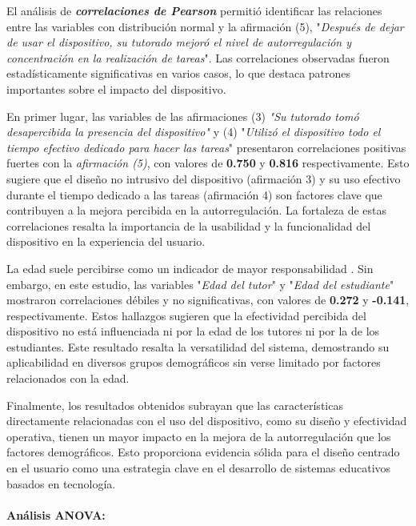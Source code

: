 \documentclass[a4paper,fleqn]{cas-sc}
\begin{document}
					El análisis de \textit{\textbf{correlaciones de Pearson}} permitió identificar las relaciones entre las variables con distribución normal y la afirmación (5), "\textit{Después de dejar de usar el dispositivo, su tutorado mejoró el nivel de autorregulación y concentración en la realización de tareas}". Las correlaciones observadas fueron estadísticamente significativas en varios casos, lo que destaca patrones importantes sobre el impacto del dispositivo.
					
					En primer lugar, las variables de las afirmaciones (3) \textit{"Su tutorado tomó desapercibida la presencia del dispositivo"} y (4) "\textit{Utilizó el dispositivo todo el tiempo efectivo dedicado para hacer las tareas}" presentaron correlaciones positivas fuertes con la \textit{afirmación (5)}, con valores de \textbf{0.750} y \textbf{0.816} respectivamente. Esto sugiere que el diseño no intrusivo del dispositivo (afirmación 3) y su uso efectivo durante el tiempo dedicado a las tareas (afirmación 4) son factores clave que contribuyen a la mejora percibida en la autorregulación. La fortaleza de estas correlaciones resalta la importancia de la usabilidad y la funcionalidad del dispositivo en la experiencia del usuario.
					
					La edad suele percibirse como un indicador de mayor responsabilidad \citep{Moss2018Why}. Sin embargo, en este estudio, las variables "\textit{Edad del tutor}" y "\textit{Edad del estudiante}" mostraron correlaciones débiles y no significativas, con valores de \textbf{0.272} y \textbf{-0.141}, respectivamente. Estos hallazgos sugieren que la efectividad percibida del dispositivo no está influenciada ni por la edad de los tutores ni por la de los estudiantes. Este resultado resalta la versatilidad del sistema, demostrando su aplicabilidad en diversos grupos demográficos sin verse limitado por factores relacionados con la edad.
					
					Finalmente, los resultados obtenidos subrayan que las características directamente relacionadas con el uso del dispositivo, como su diseño y efectividad operativa, tienen un mayor impacto en la mejora de la autorregulación que los factores demográficos. Esto proporciona evidencia sólida para el diseño centrado en el usuario como una estrategia clave en el desarrollo de sistemas educativos basados en tecnología.
					
					\paragraph*{Análisis ANOVA:}
					
\end{document}
